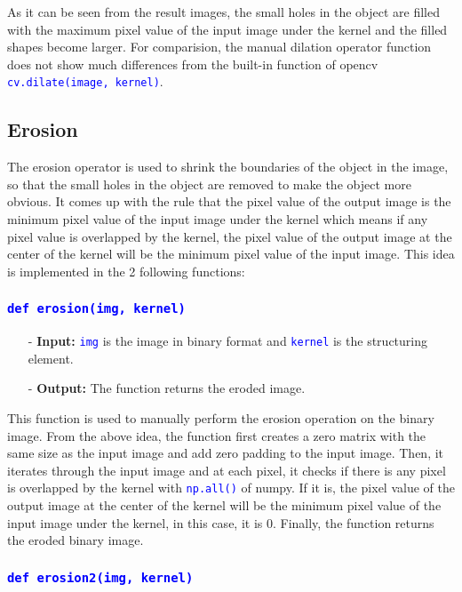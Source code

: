 \documentclass{report}
\begin{document}
As it can be seen from the result images, the small holes in the object are filled with the maximum pixel value of the input image under the kernel and the filled shapes become larger. For comparision, the manual dilation operator function does not show much differences from the built-in function of opencv \textcolor{blue}{\lstinline|cv.dilate(image, kernel)|}.

\pagebreak
\subsection{Erosion}
The erosion operator is used to shrink the boundaries of the object in the image, so that the small holes in the object are removed to make the object more obvious. It comes up with the rule that the pixel value of the output image is the minimum pixel value of the input image under the kernel which means if any pixel value is overlapped by the kernel, the pixel value of the output image at the center of the kernel will be the minimum pixel value of the input image. This idea is implemented in the 2 following functions:

\subsubsection*{\textcolor{blue}{\lstinline|def erosion(img, kernel)|}}

\begin{itemize}
  \item[-] \textbf{Input:} \textcolor{blue}{\lstinline|img|} is the image in binary format and \textcolor{blue}{\lstinline|kernel|} is the structuring element.
  \item[-] \textbf{Output:} The function returns the eroded image.
\end{itemize}

This function is used to manually perform the erosion operation on the binary image. From the above idea, the function first creates a zero matrix with the same size as the input image and add zero padding to the input image. Then, it iterates through the input image and at each pixel, it checks if there is any pixel is overlapped by the kernel with \textcolor{blue}{\lstinline|np.all()|} of numpy. If it is, the pixel value of the output image at the center of the kernel will be the minimum pixel value of the input image under the kernel, in this case, it is 0. Finally, the function returns the eroded binary image.

\subsubsection*{\textcolor{blue}{\lstinline|def erosion2(img, kernel)|}}
\end{document}
